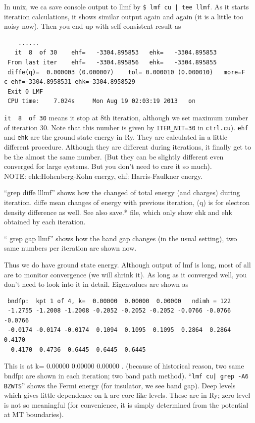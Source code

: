 \documentclass[a4paper,10pt,epsf,fleqn]{article}
\begin{document}
In unix, we ca save console output to llmf by
\verb+$ lmf cu | tee llmf+.
As it starts iteration calculations, 
it shows similar output again and again (it is a little too noisy now).
Then you end up with self-consistent result as
\begin{verbatim}
    ......
   it  8  of 30    ehf=   -3304.895853   ehk=   -3304.895853
 From last iter    ehf=   -3304.895856   ehk=   -3304.895855
 diffe(q)=  0.000003 (0.000007)    tol= 0.000010 (0.000010)   more=F
c ehf=-3304.8958531 ehk=-3304.8958529
 Exit 0 LMF 
 CPU time:    7.024s     Mon Aug 19 02:03:19 2013   on  
\end{verbatim}
\verb+it  8  of 30+ means it stop at 8th iteration, although we set
maximum number of iteration 30. Note that this number is 
given by \verb+ITER_NIT=30+ in \verb+ctrl.cu+).
\verb+ehf+ and \verb+ehk+ are the ground state energy in Ry.
They are calculated in a little different procedure. Although
they are different during iterations, it finally get to be the
almost the same number. (But they can be slightly different 
even converged for large systems. But you don't need to care it so much).\\
NOTE: ehk:Hohenberg-Kohn energy, ehf: Harris-Faulkner energy.

``grep diffe lllmf'' shows how the changed of total energy (and charges)
during iteration. diffe mean  changes of energy with previous
iteration, (q) is for electron density difference as well.
See also save.* file, which only show ehk and ehk obtained by each
iteration.

`` grep gap llmf'' shows how the band gap changes
(in the usual setting), two same numbers per iteration are shown now.

Thus we do have ground state energy.
Although output of lmf is long, most of all are to monitor
convergence (we will shrink it).
As long as it converged well, you don't need to look into it in detail.
Eigenvalues are shown as
\begin{verbatim}
 bndfp:  kpt 1 of 4, k=  0.00000  0.00000  0.00000   ndimh = 122
 -1.2755 -1.2008 -1.2008 -0.2052 -0.2052 -0.2052 -0.0766 -0.0766 -0.0766
 -0.0174 -0.0174 -0.0174  0.1094  0.1095  0.1095  0.2864  0.2864  0.4170
  0.4170  0.4736  0.6445  0.6445  0.6445
\end{verbatim}
This is at k=  0.00000  0.00000  0.00000 .
(because of historical reason, two same bndfp: are shown in each
iteration; two band path method).  ``\verb+lmf cu| grep -A6 BZWTS+'' shows the Fermi energy
(for insulator, we see band gap). 
Deep levels which gives little dependence on k are core like levels.
These are in Ry; zero level is not so meaningful (for convenience, it is
simply determined from the potential at MT boundaries).
\end{document}
